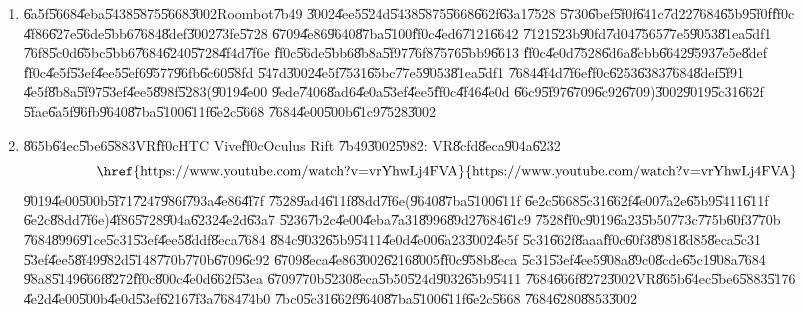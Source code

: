 \documentclass[12pt,a4paper]{article}
\begin{document}
\begin{enumerate}
\item \U{6a5f}\U{5668}\U{4eba}\U{5438}\U{5875}\U{5668}\U{3002}Roombot\U{7b49}%
\U{3002}\U{4ee5}\U{524d}\U{5438}\U{5875}\U{5668}\U{662f}\U{63a1}\U{7528}%
\U{5730}\U{6bef}\U{5f0f}\U{641c}\U{7d22}\U{7684}\U{65b9}\U{5f0f}\U{ff0c}%
\U{4f86}\U{627e}\U{56de}\U{5bb6}\U{7684}\U{8def}\U{3002}\U{73fe}\U{5728}%
\U{6709}\U{4e86}\U{9640}\U{87ba}\U{5100}\U{ff0c}\U{4ed6}\U{7121}\U{6642}%
\U{7121}\U{523b}\U{90fd}\U{7d04}\U{7565}\U{77e5}\U{9053}\U{81ea}\U{5df1}%
\U{76f8}\U{5c0d}\U{65bc}\U{5bb6}\U{7684}\U{6240}\U{5728}\U{4f4d}\U{7f6e}%
\U{ff0c}\U{56de}\U{5bb6}\U{8b8a}\U{5f97}\U{76f8}\U{7576}\U{5bb9}\U{6613}%
\U{ff0c}\U{4e0d}\U{7528}\U{6d6a}\U{8cbb}\U{6642}\U{9593}\U{7e5e}\U{8def}%
\U{ff0c}\U{4e5f}\U{53ef}\U{4ee5}\U{5ef6}\U{9577}\U{96fb}\U{6c60}\U{58fd}%
\U{547d}\U{3002}\U{4e5f}\U{7531}\U{65bc}\U{77e5}\U{9053}\U{81ea}\U{5df1}%
\U{7684}\U{4f4d}\U{7f6e}\U{ff0c}\U{6253}\U{6383}\U{7684}\U{8def}\U{5f91}%
\U{4e5f}\U{8b8a}\U{5f97}\U{53ef}\U{4ee5}\U{898f}\U{5283}(\U{9019}\U{4e00}%
\U{9ede}\U{7406}\U{8ad6}\U{4e0a}\U{53ef}\U{4ee5}\U{ff0c}\U{4f46}\U{4e0d}%
\U{66c9}\U{5f97}\U{6709}\U{6c92}\U{6709})\U{3002}\U{9019}\U{5c31}\U{662f}%
\U{5fae}\U{6a5f}\U{96fb}\U{9640}\U{87ba}\U{5100}\U{611f}\U{6e2c}\U{5668}%
\U{7684}\U{4e00}\U{500b}\U{61c9}\U{7528}\U{3002}

\item \U{865b}\U{64ec}\U{5be6}\U{5883}VR\U{ff0c}HTC Vive\U{ff0c}Oculus Rift%
\U{7b49}\U{3002}\U{5982}: VR\U{8cfd}\U{8eca}\U{904a}\U{6232}%
\begin{equation*}
\text{\href{https://www.youtube.com/watch?v=vrYhwLj4FVA}{%
https://www.youtube.com/watch?v=vrYhwLj4FVA}}
\end{equation*}%
\U{9019}\U{4e00}\U{500b}\U{5f71}\U{7247}\U{986f}\U{793a}\U{4e86}\U{4f7f}%
\U{7528}\U{9ad4}\U{611f}\U{88dd}\U{7f6e}(\U{9640}\U{87ba}\U{5100}\U{611f}%
\U{6e2c}\U{5668}\U{5c31}\U{662f}\U{4e00}\U{7a2e}\U{65b9}\U{5411}\U{611f}%
\U{6e2c}\U{88dd}\U{7f6e})\U{4f86}\U{5728}\U{904a}\U{6232}\U{4e2d}\U{63a7}%
\U{5236}\U{7b2c}\U{4e00}\U{4eba}\U{7a31}\U{8996}\U{89d2}\U{7684}\U{61c9}%
\U{7528}\U{ff0c}\U{9019}\U{6a23}\U{5b50}\U{773c}\U{775b}\U{60f3}\U{770b}%
\U{7684}\U{8996}\U{91ce}\U{5c31}\U{53ef}\U{4ee5}\U{8ddf}\U{8eca}\U{7684}%
\U{884c}\U{9032}\U{65b9}\U{5411}\U{4e0d}\U{4e00}\U{6a23}\U{3002}\U{4e5f}%
\U{5c31}\U{662f}\U{8aaa}\U{ff0c}\U{60f3}\U{8981}\U{8d85}\U{8eca}\U{5c31}%
\U{53ef}\U{4ee5}\U{8f49}\U{982d}\U{5148}\U{770b}\U{770b}\U{6709}\U{6c92}%
\U{6709}\U{8eca}\U{4e86}\U{3002}\U{6216}\U{8005}\U{ff0c}\U{958b}\U{8eca}%
\U{5c31}\U{53ef}\U{4ee5}\U{908a}\U{89c0}\U{8cde}\U{65c1}\U{908a}\U{7684}%
\U{98a8}\U{5149}\U{666f}\U{8272}\U{ff0c}\U{800c}\U{4e0d}\U{662f}\U{53ea}%
\U{6709}\U{770b}\U{5230}\U{8eca}\U{5b50}\U{524d}\U{9032}\U{65b9}\U{5411}%
\U{7684}\U{666f}\U{8272}\U{3002}VR\U{865b}\U{64ec}\U{5be6}\U{5883}\U{5176}%
\U{4e2d}\U{4e00}\U{500b}\U{4e0d}\U{53ef}\U{6216}\U{7f3a}\U{7684}\U{74b0}%
\U{7bc0}\U{5c31}\U{662f}\U{9640}\U{87ba}\U{5100}\U{611f}\U{6e2c}\U{5668}%
\U{7684}\U{6280}\U{8853}\U{3002}


\end{enumerate}
\end{document}
